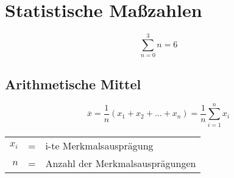 \section{Statistische Maßzahlen}

\begin{equation}
\sum_{n=0}^{3}n=6
\end{equation}

\subsection{Arithmetische Mittel}
\begin{equation}
\overline{x} = \frac{1}{n}(x_1+x_2+...+x_n)=\frac{1}{n}\sum_{i=1}^{n}x_i
\end{equation}
\begin{center}\begin{tabular}{rcl}
   $x_i$ & = & i-te Merkmalsausprägung  \\
   $n$ & = & Anzahl der Merkmalsausprägungen \\
\end{tabular}\end{center}